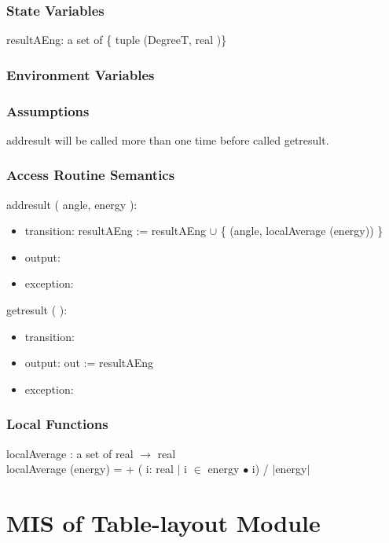 \documentclass[12pt, titlepage]{article}
\begin{document}
\subsubsection{State Variables}
resultAEng: a set of \{ tuple (DegreeT, real )\}  \\


\subsubsection{Environment Variables}


\subsubsection{Assumptions}
addresult will be called more than one time before called getresult.

\subsubsection{ Access Routine Semantics}

\noindent  addresult ( angle, energy ):
\begin{itemize}
\item transition: resultAEng := resultAEng $\cup$ \{ (angle, localAverage (energy))  \}

\item output:
\item exception: 
\end{itemize}

\noindent  getresult (  ):
\begin{itemize}
\item transition: 
\item output: out := resultAEng
\item exception: 
\end{itemize}


\subsubsection{Local Functions}

localAverage : a set of real $\rightarrow$ real\\
localAverage (energy) =  + ( i: real $|$ i $\in$ energy $\bullet$  i) / $|$energy$|$\\



\section{MIS of Table-layout Module} \label{ModuleT} 
\end{document}
